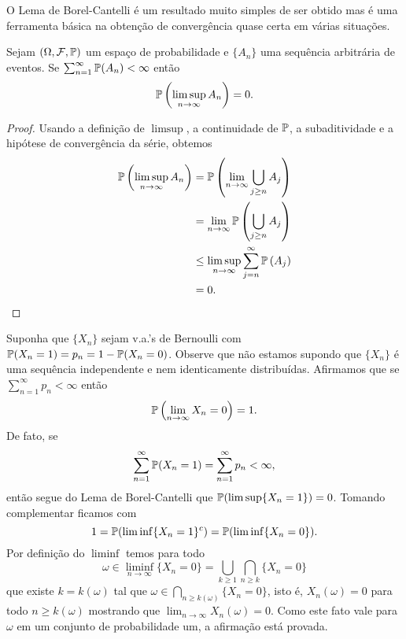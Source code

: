 O Lema de Borel-Cantelli é um resultado muito simples 
de ser obtido mas é uma ferramenta básica na obtenção de 
convergência quase certa em várias situações.

\begin{lema}
Sejam $(\Omega,\F,\P)$ um espaço de probabilidade 
e $\{A_n\}$ uma sequência arbitrária de eventos.
Se $\sum_{n=1}^{\infty} \P(A_n)<\infty$ então 
	\[
		\P\left(\limsup_{n\to\infty} A_n\right)=0.
	\]
\end{lema}




\begin{proof}
Usando a definição de $\limsup$, a continuidade de $\P$,
a subaditividade e a hipótese de convergência da série, 
obtemos
	\begin{align*}
	\P\left(\limsup_{n\to\infty} A_n\right)
	&=
	\P\left( \lim_{n\to\infty} \bigcup_{j\geq n} A_j \right)
	\\
	&=
	\lim_{n\to\infty}\P\left( \bigcup_{j\geq n} A_j \right)
	\\
	&\leq
	\limsup_{n\to\infty} \sum_{j=n}^{\infty}\P\left( A_j \right)
	\\
	&=
	0.
	\end{align*}
\end{proof}



\begin{exemplo}
	Suponha que $\{X_n\}$ sejam v.a.'s de Bernoulli 
	com $\P(X_n=1)=p_n=1-\P(X_n=0)$. 
	Observe que não estamos supondo que $\{X_n\}$ é
	uma sequência independente e nem identicamente distribuídas.
	Afirmamos que se $\sum_{n=1}^{\infty}p_n<\infty$ então 
		\[
			\P\left( \lim_{n\to\infty} X_n=0\right)=1. 
		\]
	De fato, se 
		\[
			 \sum_{n=1}^{\infty} \P(X_n=1) 
			 = 
			 \sum_{n=1}^{\infty}p_n 
			 < \infty,
		\]
	então segue do Lema de Borel-Cantelli que $\P(\limsup \{X_n=1\})=0$.
	Tomando complementar ficamos com 
	\[
		1
		=
		\P(\liminf \{X_n=1\}^c)
		=
		\P(\liminf \{X_n=0\}).
	\]
	Por definição do $\liminf$ temos 
	para todo 
	\[
		\omega
		\in 
		\liminf_{n\to\infty} \{X_n=0\}
		=
		\bigcup_{k\geq 1} \bigcap_{n\geq k} \{X_n=0\}		
	\]
	que existe $k=k(\omega)$ tal que 
	$\omega \in \bigcap_{n\geq k(\omega)} \{X_n=0\}$,
	isto é, $X_n(\omega)=0$ para todo $n\geq k(\omega)$
	mostrando que $\lim_{n\to\infty} X_n(\omega)=0$.
	Como este fato vale para $\omega$ em um conjunto 
	de probabilidade um, a afirmação está provada.
\end{exemplo}













